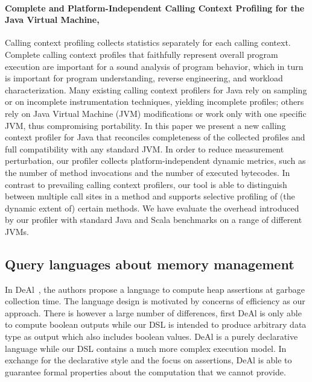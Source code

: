 \paragraph{Complete and Platform-Independent Calling Context Profiling for the Java Virtual Machine, \cite{Sarimbekov201161}}
Calling context profiling collects statistics separately for each calling context. Complete calling context profiles that faithfully represent overall program execution are important for a sound analysis of program behavior, which in turn is important for program understanding, reverse engineering, and workload characterization. Many existing calling context profilers for Java rely on sampling or on incomplete instrumentation techniques, yielding incomplete profiles; others rely on Java Virtual Machine (JVM) modifications or work only with one specific JVM, thus compromising portability. In this paper we present a new calling context profiler for Java that reconciles completeness of the collected profiles and full compatibility with any standard JVM. In order to reduce measurement perturbation, our profiler collects platform-independent dynamic metrics, such as the number of method invocations and the number of executed bytecodes. In contrast to prevailing calling context profilers, our tool is able to distinguish between multiple call sites in a method and supports selective profiling of (the dynamic extent of) certain methods. We have evaluate the overhead introduced by our profiler with standard Java and Scala benchmarks on a range of different JVMs.

\subsection{Query languages about memory management}

In DeAl~\cite{Reichenbach:2010:GCE:1869459.1869482}, the authors propose a language to compute heap assertions at garbage collection time.
The language design is motivated by concerns of efficiency as our approach.
There is however a large number of differences, first DeAl is only able to compute boolean outputs while our DSL is intended to produce arbitrary data type as output which also includes boolean values.
DeAl is a purely declarative language while our DSL contains a much more complex execution model.
In exchange for the declarative style and the focus on assertions, DeAl is able to guarantee formal properties about the computation that we cannot provide. 

